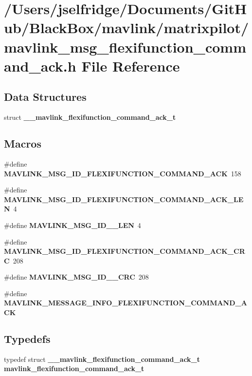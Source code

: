 \section{/\+Users/jselfridge/\+Documents/\+Git\+Hub/\+Black\+Box/mavlink/matrixpilot/mavlink\+\_\+msg\+\_\+flexifunction\+\_\+command\+\_\+ack.h File Reference}
\label{mavlink__msg__flexifunction__command__ack_8h}
\subsection*{Data Structures}
\begin{DoxyCompactItemize}
\item 
struct \textbf{ \+\_\+\+\_\+mavlink\+\_\+flexifunction\+\_\+command\+\_\+ack\+\_\+t}
\end{DoxyCompactItemize}
\subsection*{Macros}
\begin{DoxyCompactItemize}
\item 
\#define \textbf{ M\+A\+V\+L\+I\+N\+K\+\_\+\+M\+S\+G\+\_\+\+I\+D\+\_\+\+F\+L\+E\+X\+I\+F\+U\+N\+C\+T\+I\+O\+N\+\_\+\+C\+O\+M\+M\+A\+N\+D\+\_\+\+A\+CK}~158
\item 
\#define \textbf{ M\+A\+V\+L\+I\+N\+K\+\_\+\+M\+S\+G\+\_\+\+I\+D\+\_\+\+F\+L\+E\+X\+I\+F\+U\+N\+C\+T\+I\+O\+N\+\_\+\+C\+O\+M\+M\+A\+N\+D\+\_\+\+A\+C\+K\+\_\+\+L\+EN}~4
\item 
\#define \textbf{ M\+A\+V\+L\+I\+N\+K\+\_\+\+M\+S\+G\+\_\+\+I\+D\+\_\+\_\+\+L\+EN}~4
\item 
\#define \textbf{ M\+A\+V\+L\+I\+N\+K\+\_\+\+M\+S\+G\+\_\+\+I\+D\+\_\+\+F\+L\+E\+X\+I\+F\+U\+N\+C\+T\+I\+O\+N\+\_\+\+C\+O\+M\+M\+A\+N\+D\+\_\+\+A\+C\+K\+\_\+\+C\+RC}~208
\item 
\#define \textbf{ M\+A\+V\+L\+I\+N\+K\+\_\+\+M\+S\+G\+\_\+\+I\+D\+\_\+\_\+\+C\+RC}~208
\item 
\#define \textbf{ M\+A\+V\+L\+I\+N\+K\+\_\+\+M\+E\+S\+S\+A\+G\+E\+\_\+\+I\+N\+F\+O\+\_\+\+F\+L\+E\+X\+I\+F\+U\+N\+C\+T\+I\+O\+N\+\_\+\+C\+O\+M\+M\+A\+N\+D\+\_\+\+A\+CK}
\end{DoxyCompactItemize}
\subsection*{Typedefs}
\begin{DoxyCompactItemize}
\item 
typedef struct \textbf{ \+\_\+\+\_\+mavlink\+\_\+flexifunction\+\_\+command\+\_\+ack\+\_\+t} \textbf{ mavlink\+\_\+flexifunction\+\_\+command\+\_\+ack\+\_\+t}
\end{DoxyCompactItemize}


